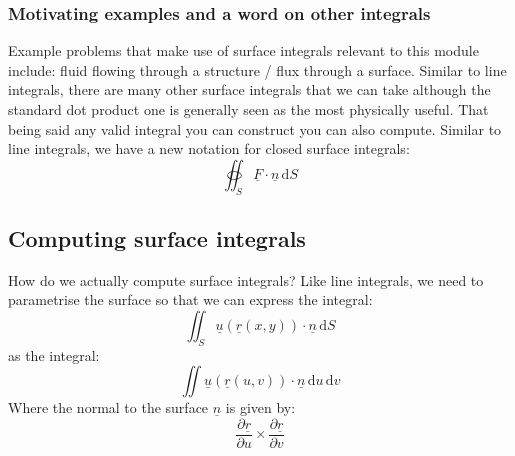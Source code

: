 \documentclass[12pt]{article}
\newcommand{\pf}[2]{\frac{\partial #1}{\partial #2}}
\begin{document}
\subsubsection{Motivating examples and a word on other integrals}
Example problems that make use of surface integrals relevant to this module include: fluid flowing through a structure / flux through a surface. Similar to line integrals, there are many other surface integrals that we can take although the standard dot product one is generally seen as the most physically useful. That being said any valid integral you can construct you can also compute. Similar to line integrals, we have a new notation for closed surface integrals:
\[\oiint_S\underline{F}\cdot\underline{n}\,\text{d}S\]
\subsection{Computing surface integrals}
How do we actually compute surface integrals? Like line integrals, we need to parametrise the surface so that we can express the integral:
\[\iint_S\underline{u}(\underline{r}(x,y))\cdot\underline{n}\,\text{d}S\]
as the integral:
\[\iint \underline{u}(\underline{r}(u,v))\cdot\underline{n}\,\text{d}u\,\text{d}v\]
Where the normal to the surface \(\underline{n}\) is given by:
\[\pf{\underline{r}}{u}\times \pf{\underline{r}}{v}\]
\end{document}
